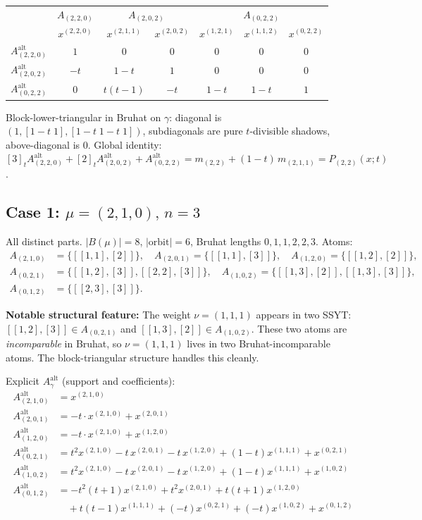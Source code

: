 \documentclass[11pt]{article}
\theoremstyle{definition}
\theoremstyle{remark}
\newcommand{\Aalt}{A^{\mathrm{alt}}}
\begin{document}
\begin{tabular}{r|c|cc|ccc}
 & \multicolumn{1}{c}{$A_{(2,2,0)}$} & \multicolumn{2}{|c}{$A_{(2,0,2)}$} & \multicolumn{3}{|c}{$A_{(0,2,2)}$} \\
 & $x^{(2,2,0)}$ & $x^{(2,1,1)}$ & $x^{(2,0,2)}$ & $x^{(1,2,1)}$ & $x^{(1,1,2)}$ & $x^{(0,2,2)}$ \\
\hline
$\Aalt_{(2,2,0)}$ & $1$          & $0$    & $0$   & $0$   & $0$   & $0$ \\
$\Aalt_{(2,0,2)}$ & $-t$         & $1-t$  & $1$   & $0$   & $0$   & $0$ \\
$\Aalt_{(0,2,2)}$ & $0$          & $t(t-1)$ & $-t$ & $1-t$ & $1-t$ & $1$ \\
\end{tabular}
\medskip

Block-lower-triangular in Bruhat on $\gamma$: diagonal is
$(1, [1-t\;1], [1-t\;1-t\;1])$, subdiagonals are pure $t$-divisible
shadows, above-diagonal is $0$. Global identity:
$[3]_t \Aalt_{(2,2,0)} + [2]_t \Aalt_{(2,0,2)} + \Aalt_{(0,2,2)} = m_{(2,2)} + (1-t)\, m_{(2,1,1)} = P_{(2,2)}(x; t)$.

\subsection{Case 1: $\mu = (2,1,0),\, n = 3$}

All distinct parts. $|B(\mu)| = 8$, $|\text{orbit}| = 6$, Bruhat lengths
$0, 1, 1, 2, 2, 3$. Atoms:
\[
\begin{aligned}
   A_{(2,1,0)} &= \{[[1,1],[2]]\}, \quad A_{(2,0,1)} = \{[[1,1],[3]]\}, \quad A_{(1,2,0)} = \{[[1,2],[2]]\},\\
   A_{(0,2,1)} &= \{[[1,2],[3]], [[2,2],[3]]\}, \quad A_{(1,0,2)} = \{[[1,3],[2]], [[1,3],[3]]\},\\
   A_{(0,1,2)} &= \{[[2,3],[3]]\}.
\end{aligned}
\]

\textbf{Notable structural feature:} The weight $\nu = (1,1,1)$ appears
in two SSYT: $[[1,2],[3]] \in A_{(0,2,1)}$ and $[[1,3],[2]] \in A_{(1,0,2)}$.
These two atoms are \emph{incomparable} in Bruhat, so $\nu = (1,1,1)$
lives in two Bruhat-incomparable atoms. The block-triangular structure
handles this cleanly.

Explicit $\Aalt_\gamma$ (support and coefficients):
\begin{align*}
\Aalt_{(2,1,0)} &= x^{(2,1,0)} \\
\Aalt_{(2,0,1)} &= -t \cdot x^{(2,1,0)} + x^{(2,0,1)} \\
\Aalt_{(1,2,0)} &= -t \cdot x^{(2,1,0)} + x^{(1,2,0)} \\
\Aalt_{(0,2,1)} &= t^2 x^{(2,1,0)} - t \, x^{(2,0,1)} - t \, x^{(1,2,0)} + (1-t) x^{(1,1,1)} + x^{(0,2,1)} \\
\Aalt_{(1,0,2)} &= t^2 x^{(2,1,0)} - t \, x^{(2,0,1)} - t \, x^{(1,2,0)} + (1-t) x^{(1,1,1)} + x^{(1,0,2)} \\
\Aalt_{(0,1,2)} &= -t^2(t+1) x^{(2,1,0)} + t^2 x^{(2,0,1)} + t(t+1) x^{(1,2,0)} \\
   &\quad + t(t-1) x^{(1,1,1)} + (-t) x^{(0,2,1)} + (-t) x^{(1,0,2)} + x^{(0,1,2)}
\end{align*}
\end{document}
